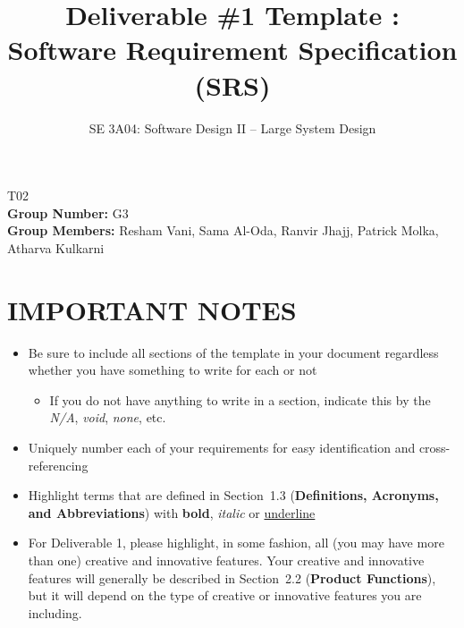 \documentclass[]{article}
\title{Deliverable \#1 Template : Software Requirement Specification (SRS)}
\author{SE 3A04: Software Design II -- Large System Design}
\date{}
\begin{document}







\maketitle	
{} T02\\
{\bf Group Number:} G3 \\
{\bf Group Members:} Resham Vani, Sama Al-Oda, Ranvir Jhajj, Patrick Molka, Atharva Kulkarni

\section*{IMPORTANT NOTES}
\begin{itemize}
	\item Be sure to include all sections of the template in your document regardless whether you have something to write for each or not
	\begin{itemize}
		\item If you do not have anything to write in a section, indicate this by the \emph{N/A}, \emph{void}, \emph{none}, etc.
	\end{itemize}
	\item Uniquely number each of your requirements for easy identification and cross-referencing
	\item Highlight terms that are defined in Section~1.3 (\textbf{Definitions, Acronyms, and Abbreviations}) with \textbf{bold}, \emph{italic} or \underline{underline}
	\item For Deliverable 1, please highlight, in some fashion, all (you may have more than one) creative and innovative features. Your creative and innovative features will generally be described in Section~2.2 (\textbf{Product Functions}), but it will depend on the type of creative or innovative features you are including.
\end{itemize}

\introduction


\product


\usecase



{\functional}

\end{document}
